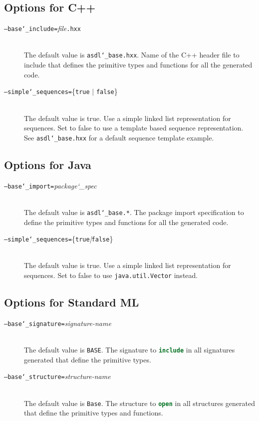 \subsection{Options for C++}

\begin{description}
  \item[\normalfont\texttt{--base\char`\_include=}\textit{file}\texttt{.hxx}] \mbox{}\\
    The default value is \texttt{asdl\char`\_base.hxx}. Name of the C++ header file to
    include that defines the primitive types and functions for all the generated
    code. 
  \item[\normalfont\texttt{--simple\char`\_sequences=}\{\texttt{true} $|$ \texttt{false}\}] \mbox{}\\
    The default value is true. Use a simple linked list representation 
    for sequences. Set to false to use a template based sequence 
    representation. See \texttt{asdl\char`\_base.hxx} for a default sequence template 
    example. 
\end{description}%

\subsection{Options for Java}
\begin{description}
  \item[\normalfont\texttt{--base\char`\_import=}\textit{package\char`\_spec}] \mbox{}\\
    The default value is \texttt{asdl\char`\_base.*}. The package import specification
    to define the primitive types and functions for all the generated
    code. 
  \item[\normalfont\texttt{--simple\char`\_sequences=}\{\texttt{true}\textit{|}\texttt{false}\}] \mbox{}\\
    The default value is true. Use a simple linked list representation 
    for sequences. Set to false to use  \texttt{java.util.Vector} instead.
\end{description}%

\subsection{Options for Standard ML}
\begin{description}
  \item[\normalfont\texttt{--base\char`\_signature=}\textit{signature-name}] \mbox{}\\
    The default value is \texttt{BASE}. The signature to \lstinline[language=SML]!include! in
    all signatures generated that define the primitive types.
  \item[\normalfont\texttt{--base\char`\_structure=}\textit{structure-name}] \mbox{}\\
    The default value is \texttt{Base}. The structure to \lstinline[language=SML]!open! in
    all structures generated that define the primitive types and functions.
\end{description}%

